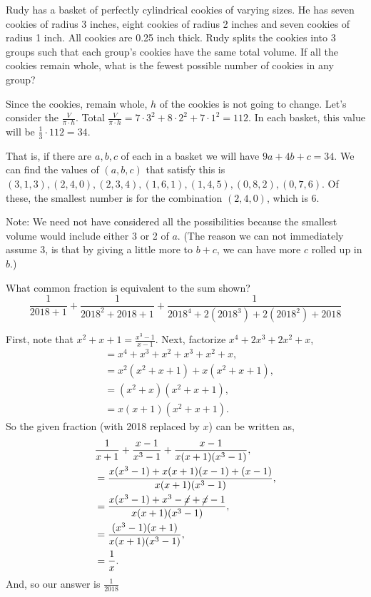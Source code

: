 \documentclass[11pt,twoside]{scrartcl}
\begin{document}
\begin{problem}
    Rudy has a basket of perfectly cylindrical cookies of varying sizes. He has seven cookies of radius 3 inches, eight cookies of radius 2 inches and seven cookies of radius 1 inch. All cookies are 0.25 inch thick. Rudy splits the cookies into 3 groups such that each group's cookies have the same total volume. If all the cookies remain whole, what is the fewest possible number of cookies in any group?
    \begin{sketch}
        Since the cookies, remain whole, $h$ of the cookies is not going to change. Let's consider the $\frac{V}{\pi \cdot h}$. Total $\frac{V}{\pi \cdot h} = 7\cdot3^2 + 8 \cdot 2^2 + 7 \cdot 1^2 = 112$. In each basket, this value will be $\frac{1}{3}\cdot 112 = 34$. 
        
        That is, if there are $a,b,c$ of each in a basket we will have $9a + 4b + c = 34.$ We can find the values of $(a,b,c)$ that satisfy this is $(3,1,3), (2,4,0), (2, 3, 4), (1,6,1), (1, 4, 5), (0,8,2), (0,7,6)$. Of these, the smallest number is for the combination $(2,4,0)$, which is $\boxed{6}$.

        Note: We need not have considered all the possibilities because the smallest volume would include either 3 or 2 of $a$. (The reason we can not immediately assume 3, is that by giving a little more to $b+c$, we can have more $c$ rolled up in $b$.)
    \end{sketch}
\end{problem}

\begin{problem}
    What common fraction is equivalent to the sum shown?
    \[ \frac{1}{2018+1} + \frac{1}{2018^2+2018+1} + \frac{1}{2018^4+2(2018^3)+2(2018^2)+2018} \]
    \begin{sketch}
        First, note that $x^2 + x + 1 = \frac{x^3-1}{x-1}$.
        Next, factorize $x^4 + 2x^3 + 2x^2 + x$,
        \begin{align*}
            &= x^4 + x^3+x^2 + x^3 + x^2 + x, \\
            &= x^2(x^2+x+1) + x(x^2+x+1), \\
            &= (x^2+x)(x^2+x+1), \\
            &= x(x+1)(x^2+x+1).
        \end{align*}     
        So the given fraction (with 2018 replaced by $x$) can be written as,
        \begin{align*}
            &\frac{1}{x+1} + \frac{x-1}{x^3-1} + \frac{x-1}{x(x+1)(x^3-1)}, \\
            &= \frac{x(x^3-1)+x(x+1)(x-1)+(x-1)}{x(x+1)(x^3-1)}, \\
            &= \frac{x(x^3-1) + x^3 - \cancel{x} + \cancel{x} - 1}{x(x+1)(x^3-1)}, \\
            &= \frac{(x^3-1)(x+1)}{x(x+1)(x^3-1)}, \\
            &= \frac{1}{x}.
        \end{align*}
        And, so our answer is $\boxed{\frac{1}{2018}}$
    \end{sketch}
\end{problem}
\end{document}

